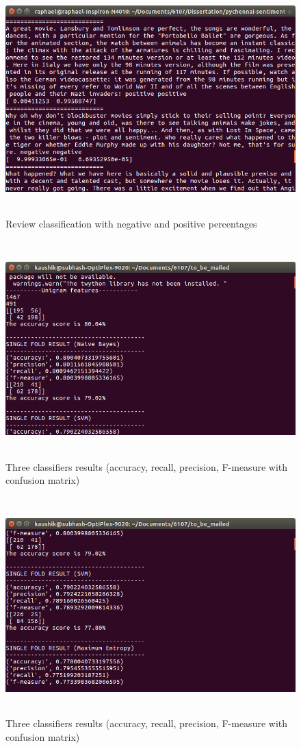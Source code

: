 \documentclass[oneside,a4paper,12pt]{pictreport}
\begin{document}
\begin{figure}[!h]
\includegraphics[width=5.5in,height=3.5in]{screenshot1.png}
\caption{Review classification with negative and positive percentages}
\end{figure}


\begin{figure}[!h]
\includegraphics[width=5.5in,height=3.3in]{screenshot4.png}
\caption{Three classifiers results (accuracy, recall, precision, F-measure with confusion matrix)}
\end{figure}



\begin{figure}[!h]
\includegraphics[width=5.5in,height=3.3in]{screenshot5.png}
\caption{Three classifiers results (accuracy, recall, precision, F-measure with confusion matrix)}
\end{figure}
\end{document}
